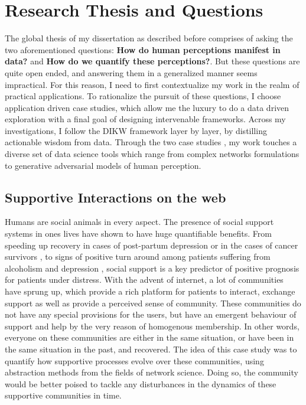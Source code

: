 \section{Research Thesis and Questions}
The global thesis  of my dissertation as described before comprises of asking the two aforementioned questions: \textbf{How do human perceptions manifest in data?} and \textbf{How do we quantify these perceptions?}. But these questions are quite open ended, and answering them in a generalized manner seems impractical. For this reason, I need to first contextualize my work in the realm  of practical applications. 
To rationalize the pursuit of these questions, I choose application driven case studies, which allow me the luxury to do a data driven exploration with a final goal of designing intervenable frameworks.
Across my investigations, I follow the DIKW framework layer by layer, by distilling actionable wisdom from data. Through the two case studies , my work touches a diverse set of data science tools  which range from complex networks formulations to generative adversarial models of human perception.

\subsection{Supportive Interactions on the web}
Humans are social animals in every aspect. The presence of social support systems in ones lives have shown to have huge quantifiable benefits. From speeding up recovery in cases of post-partum depression or in the cases of cancer survivors\cite{collins1993social,dunkel1984social,baron1990social} , to signs of positive turn around among patients suffering from alcoholism and depression \cite{peirce2000longitudinal,brown1986social}, social support is a key predictor of positive prognosis for patients under distress. With the advent of internet, a lot of communities have sprung up, which provide a rich platform for patients to interact, exchange support as well as provide a perceived sense of community. These communities do not have any special provisions for the users, but have an emergent behaviour of support and help by the very reason of homogenous membership. In other words, everyone on these communities are either in the same situation, or have been in the same situation in the past, and recovered. The idea of this case study was to quantify how supportive processes evolve over these communities, using abstraction methods from the fields of network science. Doing so, the community would be better poised to tackle any disturbances in the dynamics of these supportive communities in time. 

